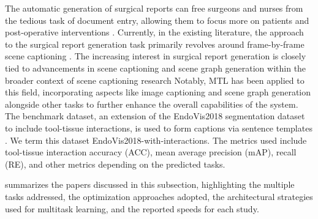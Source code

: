 The automatic generation of surgical reports can free surgeons and nurses from the tedious task of document entry, allowing them to focus more on patients and post-operative interventions \citep{xu2021class,lin2022sgt}. 
Currently, in the existing literature, the approach to the surgical report generation task primarily revolves around frame-by-frame scene captioning \citep{xu2021class,lin2022sgt,seenivasan2022global,mobarakol_task_aware}.
The increasing interest in surgical report generation is closely tied to advancements in scene captioning and scene graph generation within the broader context of scene captioning research \citep{9739429,Cornia_2020_CVPR}
Notably, MTL has been applied to this field, incorporating aspects like image captioning and scene graph generation alongside other tasks to further enhance the overall capabilities of the system. The benchmark dataset, an extension of the EndoVis2018 segmentation dataset to include tool-tissue interactions, is used to form captions via sentence templates \cite{islam2020learning}.  We term this dataset EndoVis2018-with-interactions. The metrics used include tool-tissue interaction accuracy (ACC), mean average precision (mAP), recall (RE), and other metrics depending on the predicted tasks.


 summarizes the papers discussed in this subsection, highlighting the multiple tasks addressed, the optimization approaches adopted, the architectural strategies used for multitask learning, and the reported speeds for each study.



